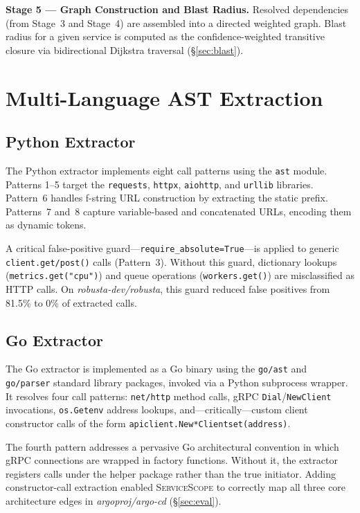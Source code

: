 \documentclass[runningheads]{llncs}
\begin{document}
\textbf{Stage 5 --- Graph Construction and Blast Radius.} Resolved
dependencies (from Stage~3 and Stage~4) are assembled into a directed
weighted graph. Blast radius for a given service is computed as the
confidence-weighted transitive closure via bidirectional Dijkstra traversal
(\S\ref{sec:blast}).

\section{Multi-Language AST Extraction}
\label{sec:extraction}

\subsection{Python Extractor}

The Python extractor implements eight call patterns using the \texttt{ast}
module. Patterns 1--5 target the \texttt{requests}, \texttt{httpx},
\texttt{aiohttp}, and \texttt{urllib} libraries. Pattern~6 handles f-string
URL construction by extracting the static prefix. Patterns~7 and~8 capture
variable-based and concatenated URLs, encoding them as dynamic tokens.

A critical false-positive guard---\texttt{require\_absolute=True}---is
applied to generic \texttt{client.get/post()} calls (Pattern~3). Without
this guard, dictionary lookups (\texttt{metrics.get("cpu")}) and
queue operations (\texttt{workers.get()}) are misclassified as HTTP
calls. On \emph{robusta-dev/robusta}, this guard reduced false positives
from 81.5\% to 0\% of extracted calls.

\subsection{Go Extractor}

The Go extractor is implemented as a Go binary using the \texttt{go/ast}
and \texttt{go/parser} standard library packages, invoked via a Python
subprocess wrapper. It resolves four call patterns: \texttt{net/http}
method calls, gRPC \texttt{Dial}/\texttt{NewClient} invocations,
\texttt{os.Getenv} address lookups, and---critically---custom client
constructor calls of the form \texttt{apiclient.New*Clientset(address)}.

The fourth pattern addresses a pervasive Go architectural convention in
which gRPC connections are wrapped in factory functions. Without it, the
extractor registers calls under the helper package rather than the true
initiator. Adding constructor-call extraction enabled \textsc{ServiceScope}
to correctly map all three core architecture edges in
\emph{argoproj/argo-cd} (\S\ref{sec:eval}).
\end{document}
